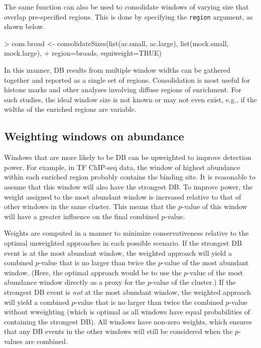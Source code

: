 \documentclass[12pt]{report}
\renewenvironment{Schunk}{\vspace{0pt}}{\vspace{0pt}}
\newcommand{\code}[1]{{\small\texttt{#1}}}
\begin{document}
The same function can also be used to consolidate windows of varying size that overlap pre-specified regions.
This is done by specifying the \code{region} argument, as shown below.

\begin{Schunk}
\begin{Sinput}
> cons.broad <- consolidateSizes(list(ac.small, ac.large), list(mock.small, mock.large), 
+     region=broads, equiweight=TRUE)
\end{Sinput}
\end{Schunk}

In this manner, DB results from multiple window widths can be gathered together and reported as a single set of regions.
Consolidation is most useful for histone marks and other analyses involving diffuse regions of enrichment.
For such studies, the ideal window size is not known or may not even exist, e.g., if the widths of the enriched regions are variable.

\subsection{Weighting windows on abundance}
Windows that are more likely to be DB can be upweighted to improve detection power.
For example, in TF ChIP-seq data, the window of highest abundance within each enriched region probably contains the binding site.
It is reasonable to assume that this window will also have the strongest DB.
To improve power, the weight assigned to the most abundant window is increased relative to that of other windows in the same cluster.
This means that the $p$-value of this window will have a greater influence on the final combined $p$-value.

Weights are computed in a manner to minimize conservativeness relative to the optimal unweighted approaches in each possible scenario. 
If the strongest DB event is at the most abundant window, the weighted approach will yield a combined $p$-value that is no larger than twice the $p$-value of the most abundant window.
(Here, the optimal approach would be to use the $p$-value of the most abundance window directly as a proxy for the $p$-value of the cluster.)
If the strongest DB event is \emph{not} at the most abundant window, the weighted approach will yield a combined $p$-value that is no larger than twice the combined $p$-value without wweighting (which is optimal as all windows have equal probabilities of containing the strongest DB).
All windows have non-zero weights, which ensures that any DB events in the other windows will still be considered when the $p$-values are combined.
\end{document}
